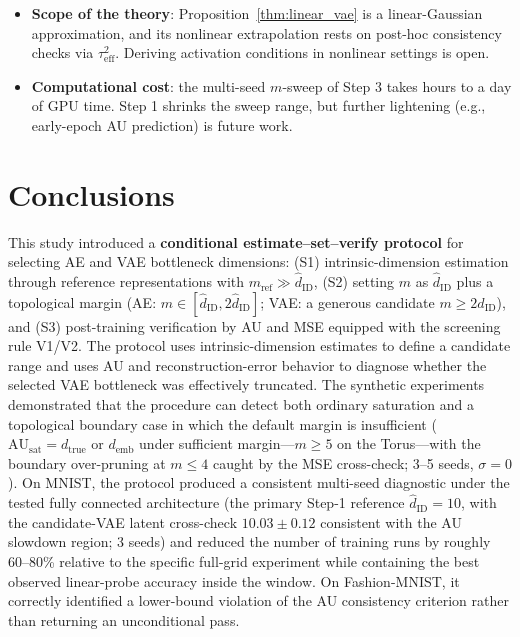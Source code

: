 \documentclass[make,article,submit,pdftex,moreauthors]{Definitions/mdpi}
\newcommand{\hatdID}{\hat{d}_{\mathrm{ID}}}
\newcommand{\dtrue}{d_{\mathrm{true}}}
\newcommand{\AUsat}{\mathrm{AU}_{\mathrm{sat}}}
\newcommand{\demb}{d_{\mathrm{emb}}}
\newcommand{\dstar}{d^{*}(\beta)}
\begin{document}
\begin{itemize}
        (Section~\ref{sec:protocol_setup}), so its read-out is tied to the
        chosen prior and latent parameterization.
        Actively exploiting the $\beta$ dependence of $\dstar$---a
        ``spectral read-out by $\beta$ sweep''---is an interesting
        extension.
        The thresholds of the decision rule (activation ratio $0.9$, factor
        $3$) are working defaults that separate the passing and failing
        cases of this paper by a wide margin; calibrating them on more
        diverse data is future work.
  \item \textbf{Scope of the theory}: Proposition~\ref{thm:linear_vae} is a
        linear-Gaussian approximation, and its nonlinear extrapolation rests
        on post-hoc consistency checks via $\tau^2_{\mathrm{eff}}$.
        Deriving activation conditions in nonlinear settings is open.
  \item \textbf{Computational cost}: the multi-seed $m$-sweep of Step 3
        takes hours to a day of GPU time.
        Step 1 shrinks the sweep range, but further lightening (e.g.,
        early-epoch AU prediction) is future work.
\end{itemize}

\section{Conclusions}\label{sec:conclusion}

This study introduced a \textbf{conditional estimate--set--verify
protocol} for selecting AE and VAE bottleneck dimensions:
(S1) intrinsic-dimension estimation through reference representations with
$m_{\mathrm{ref}} \gg \hatdID$,
(S2) setting $m$ as $\hatdID$ plus a topological margin
(AE: $m \in [\hatdID, 2\hatdID]$; VAE: a generous candidate
$m \geq 2\hatdID$), and
(S3) post-training verification by AU and MSE equipped with the screening
rule V1/V2.
The protocol uses intrinsic-dimension estimates to define a candidate
range and uses AU and reconstruction-error behavior to diagnose whether
the selected VAE bottleneck was effectively truncated.
The synthetic experiments demonstrated that the procedure can detect both
ordinary saturation and a topological boundary case in which the default
margin is insufficient ($\AUsat = \dtrue$ or $\demb$ under sufficient
margin---$m \geq 5$ on the Torus---with the boundary over-pruning at
$m \leq 4$ caught by the MSE cross-check; 3--5 seeds, $\sigma = 0$).
On MNIST, the protocol produced a consistent multi-seed diagnostic under
the tested fully connected architecture (the primary Step-1 reference
$\hatdID = 10$, with the candidate-VAE latent cross-check
$10.03 \pm 0.12$ consistent with the AU slowdown region; 3 seeds) and
reduced the number of training runs by roughly 60--80\% relative to the
specific full-grid experiment while containing the best observed
linear-probe accuracy inside the window.
On Fashion-MNIST, it correctly identified a lower-bound violation of the
AU consistency criterion rather than returning an unconditional pass.
\end{document}
